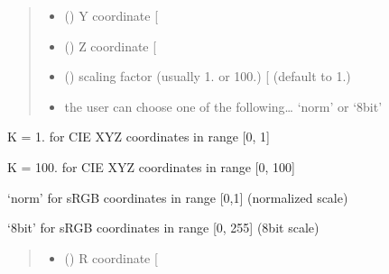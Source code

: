 \documentclass[letterpaper,10pt,english]{sphinxmanual}
\begin{document}
\begin{fulllineitems}
\begin{quote}
\begin{description}
\begin{itemize}
\item {} 
\sphinxAtStartPar
{} () \textendash{} Y coordinate {[}\sphinxhyphen{}{]}

\item {} 
\sphinxAtStartPar
{} () \textendash{} Z coordinate {[}\sphinxhyphen{}{]}

\item {} 
\sphinxAtStartPar
{} () \textendash{} scaling factor (usually 1. or 100.) {[}\sphinxhyphen{}{]} (default to 1.)

\item {} 
\sphinxAtStartPar
{} \textendash{} the user can choose one of the following… ‘norm’ or ‘8bit’

\end{itemize}

\end{description}\end{quote}

\begin{DUlineblock}{0em}
\item[] K = 1. for CIE XYZ coordinates in range {[}0, 1{]}
\item[] K = 100. for CIE XYZ coordinates in range {[}0, 100{]}
\end{DUlineblock}

\begin{DUlineblock}{0em}
\item[] ‘norm’ for sRGB coordinates in range {[}0,1{]} (normalized scale)
\item[] ‘8bit’ for sRGB coordinates in range {[}0, 255{]} (8\sphinxhyphen{}bit scale)
\end{DUlineblock}
\begin{quote}\begin{description}
\sphinxAtStartPar
\begin{itemize}
\item {} 
\sphinxAtStartPar
{} () \textendash{} R coordinate {[}\sphinxhyphen{}{]}


\end{itemize}
\end{description}
\end{quote}
\end{fulllineitems}
\end{document}

